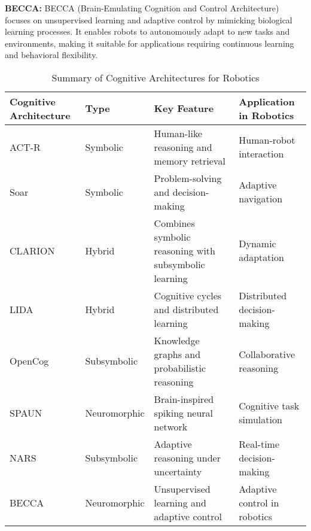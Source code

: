             \textbf{BECCA:} BECCA (Brain-Emulating Cognition and Control Architecture) focuses on unsupervised learning and adaptive control by mimicking biological learning processes. It enables robots to autonomously adapt to new tasks and environments, making it suitable for applications requiring continuous learning and behavioral flexibility. \cite{rohrer-2010-brain-emulating-cognition-and-control-architecture}

            \begin{table}[h!]
                \centering
                \begin{tabular}{|l|l|l|l|}
                    \hline
                    \textbf{Cognitive Architecture} & \textbf{Type} & \textbf{Key Feature} & \textbf{Application in Robotics} \\ \hline
                    ACT-R & Symbolic & Human-like reasoning and memory retrieval & Human-robot interaction \cite{anderson-1996-act-r} \\ \hline
                    Soar & Symbolic & Problem-solving and decision-making & Adaptive navigation \cite{lehman-1996-soar-architecture} \\ \hline
                    CLARION & Hybrid & Combines symbolic reasoning with subsymbolic learning & Dynamic adaptation \cite{sun-2006-clarion-framework} \\ \hline
                    LIDA & Hybrid & Cognitive cycles and distributed learning & Distributed decision-making \cite{franklin-2013-lida-a-systems-level-theory-of-cognition-and-action} \\ \hline
                    OpenCog & Subsymbolic & Knowledge graphs and probabilistic reasoning & Collaborative reasoning \cite{goertzel-2014-the-opencog-framework-for-artificial-general-intelligence} \\ \hline
                    SPAUN & Neuromorphic & Brain-inspired spiking neural network & Cognitive task simulation \cite{eliasmith-2012-a-large-scale-model-of-the-functioning-brain} \\ \hline
                    NARS & Subsymbolic & Adaptive reasoning under uncertainty & Real-time decision-making \cite{wang-2006-non-axiomatic-reasoning-system} \\ \hline
                    BECCA & Neuromorphic & Unsupervised learning and adaptive control & Adaptive control in robotics \cite{rohrer-2010-brain-emulating-cognition-and-control-architecture} \\ \hline
                \end{tabular}
                \caption{Summary of Cognitive Architectures for Robotics}
            \end{table}

